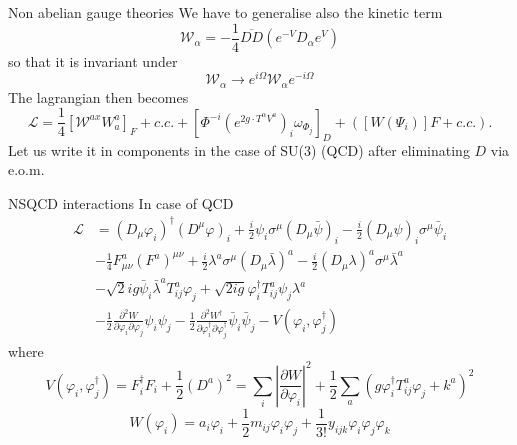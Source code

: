 \documentclass[10pt]{beamer}
\begin{document}
\begin{frame}{Non abelian gauge theories}
We have to generalise also the kinetic term 
\begin{equation*}
    \mathcal{W}_{\alpha}=-\frac{1}{4} \overline{D D}\left(e^{-V} D_{\alpha} e^{V}\right)
\end{equation*}
so that it is invariant under 
\begin{equation*}
    \mathcal{W}_{\alpha} \rightarrow e^{i \Omega} \mathcal{W}_{\alpha} e^{-i \Omega}
\end{equation*}
The lagrangian then becomes 
\begin{equation*}
    \mathcal{L}=\frac{1}{4}\left[\mathcal{W}^{a x} W_{a}^{a}\right]_{F}+c . c .+\left[\Phi^{-i}\left(e^{2 g \cdot T^{\alpha} V^{a}}\right)_{i} \omega_{\Phi_{j}}\right]_{D}+\left(\left[W\left(\Psi_{i}\right)\right] F+c . c .\right) .
\end{equation*}
Let us write it in components in the case of SU(3) (QCD) after eliminating $D$ via e.o.m.
\end{frame}

\begin{frame}{NSQCD interactions}
In case of QCD
\begin{equation*}
    \begin{aligned}
        \mathcal{L} &=\left(D_{\mu} \varphi_{i}\right)^{\dagger}\left(D^{\mu} \varphi\right)_{i}+\frac{i}{2} \psi_{i} \sigma^{\mu}\left(D_{\mu} \bar{\psi}\right)_{i}-\frac{i}{2}\left(D_{\mu} \psi\right)_{i} \sigma^{\mu} \bar{\psi}_{i}\\
        &-\frac{1}{4} F_{\mu \nu}^{a}\left(F^{a}\right)^{\mu \nu}+\frac{i}{2} \lambda^{a} \sigma^{\mu}\left(D_{\mu} \bar{\lambda}\right)^{a}-\frac{i}{2}\left(D_{\mu} \lambda\right)^{a} \sigma^{\mu} \bar{\lambda}^{a} \\
        &-\sqrt{2} i g \bar{\psi}_{i} \bar{\lambda}^{a} T_{i j}^{a} \varphi_{j}+\sqrt{2 i g} \varphi_{i}^{\dagger} T_{i j}^{a} \psi_{j} \lambda^{a} \\
        &-\frac{1}{2} \frac{\partial^{2} W}{\partial \varphi_{i} \partial \varphi_{j}} \psi_{i} \psi_{j}-\frac{1}{2} \frac{\partial^{2} W^{\dagger}}{\partial \varphi_{i}^{\dagger} \partial \varphi_{j}^{\dagger}} \bar{\psi}_{i} \bar{\psi}_{j}-V\left(\varphi_{i}, \varphi_{j}^{\dagger}\right)
        \end{aligned}
\end{equation*}
where 
\begin{equation*}
    V\left(\varphi_{i}, \varphi_{j}^{\dagger}\right)=F_{i}^{\dagger} F_{i}+\frac{1}{2}\left(D^{a}\right)^{2}=\sum_{i}\left|\frac{\partial W}{\partial \varphi_{i}}\right|^{2}+\frac{1}{2} \sum_{a}\left(g \varphi_{i}^{\dagger} T_{i j}^{a} \varphi_{j}+k^{a}\right)^{2}
\end{equation*}
\begin{equation*}
    W\left(\varphi_{i}\right)=a_{i} \varphi_{i}+\frac{1}{2} m_{i j} \varphi_{i} \varphi_{j}+\frac{1}{3 !} y_{i j k} \varphi_{i} \varphi_{j} \varphi_{k}
\end{equation*}
\end{frame}
\end{document}
